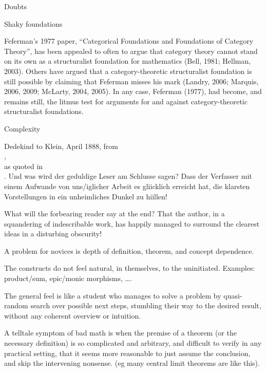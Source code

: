 \begin{plSection}{Doubts}
\begin{plSection}{Shaky foundations}
\begin{plQuote}
{}
{}
Feferman’s 1977 paper, ``Categorical Foundations and Foundations
of Category Theory'', has been appealed to often to argue 
that category theory cannot stand
on its own as a structuralist foundation for mathematics
(Bell, 1981; Hellman, 2003).
Others have argued that a category-theoretic structuralist 
foundation is still possible by
claiming that Feferman misses his mark 
(Landry, 2006; Marquis, 2006, 2009; McLarty,
2004, 2005). 
In any case, Feferman (1977), had become, and remains still, 
the litmus test for arguments for and against category-theoretic
 structuralist foundations.
\end{plQuote}

\end{plSection}%
\begin{plSection}{Complexity}
\label{sec:Complexity}

\begin{plQuote}
{Dedekind to Klein, April 1888, 
from \\
,\\
as quoted in \\
.}
{}
{Und was wird der geduldige Leser am
Schlusse sagen? Dass der Verfasser mit einem Aufwande von uns/iglicher Arbeit es gliicklich
erreicht hat, die klarsten Vorstellungen in ein unheimliches Dunkel zu hiillen!}
\par
What will the forbearing reader say at the end? That the author,
 in a squandering of indescribable work, 
 has happily managed to surround 
the clearest ideas in a disturbing obscurity!
\end{plQuote}

A problem for novices is depth of definition, theorem,
and concept dependence.


The constructs do not feel natural, in themselves, 
to the uninitiated.
Examples: product/sum, epic/monic morphisms, {\ldots}.

The general feel is like a student who manages to solve a problem
by quasi-random search over possible next steps,
stumbling their way to the desired result,
without any coherent overview or intuition.

A telltale symptom of bad math is when the premise of a theorem
(or the necessary definition) is so complicated and arbitrary,
and difficult to verify in any practical setting,
that it seems more reasonable to just assume the conclusion,
and skip the intervening nonsense.
(eg many central limit theorems are like this).


\end{plSection}
\end{plSection}
